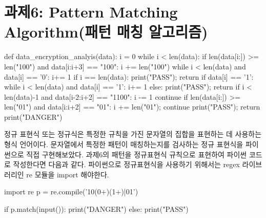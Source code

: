 \documentclass{article}
\begin{document}
\section{과제6: Pattern Matching Algorithm(패턴 매칭 알고리즘)}
\begin{python}
	def data_encryption_analyis(data):
		i = 0
		while i < len(data):
			if len(data[i:]) >= len("100") and data[i:i+3] == "100":
				i += len("100")
				while i < len(data) and data[i] == '0': i+= 1
				if i == len(data): print("PASS"); return
				if data[i] == '1': 
					while i < len(data) and data[i] == '1': i+= 1
				else: print("PASS"); return
				if i < len(data)-1 and data[i-2:i+2] == "1100": i -= 1
				continue
			if len(data[i:]) >= len("01") and data[i:i+2] == "01":
				i += len("01"); continue
			print("PASS"); return
		print("DANGER")
\end{python}
정규 표현식 또는 정규식은 특정한 규칙을 가진 문자열의 집합을 표현하는 데 사용하는 형식 언어이다.
문자열에서 특정한 패턴이 매칭하는지를 검사하는 정규 표현식을 파이썬으로 직접 구현해보았다.
과제6의 패턴을 정규표현식 규칙으로 표현하여 파이썬 코드로 작성한다면 다음과 같다. 파이썬으로
정규표현식을 사용하기 위해서는 regex 라이브러리인 re 모듈을 import 해야한다.

\begin{python}
	import re
	p = re.compile('10(0+)(1+)|01')

	if p.match(input()): print("DANGER")
	else: print("PASS")
\end{python}
\end{document}
